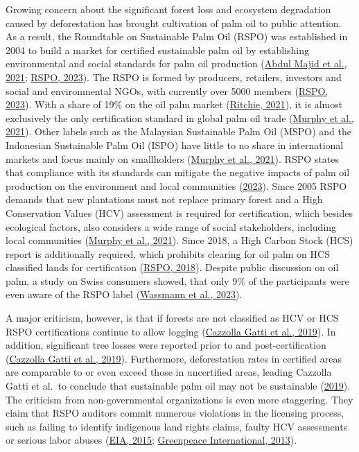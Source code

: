 \documentclass[
  letterpaper,
  DIV=11,
  numbers=noendperiod]{scrreprt}
\begin{document}
Growing concern about the significant forest loss and ecosystem
degradation caused by deforestation has brought cultivation of palm oil
to public attention. As a result, the Roundtable on Sustainable Palm Oil
(RSPO) was established in 2004 to build a market for certified
sustainable palm oil by establishing environmental and social standards
for palm oil production
(\protect\hyperlink{ref-abdulmajidSustainablePalmOil2021}{Abdul Majid et
al., 2021}; \protect\hyperlink{ref-rspoWhoWeAre2023}{RSPO, 2023}). The
RSPO is formed by producers, retailers, investors and social and
environmental NGOs, with currently over 5000 members
(\protect\hyperlink{ref-rspoWhoWeAre2023}{RSPO, 2023}). With a share of
19\% on the oil palm market
(\protect\hyperlink{ref-ritchiePalmOil2021}{Ritchie, 2021}), it is
almost exclusively the only certification standard in global palm oil
trade (\protect\hyperlink{ref-murphyOilPalm2020s2021}{Murphy et al.,
2021}). Other labels such as the Malaysian Sustainable Palm Oil (MSPO)
and the Indonesian Sustainable Palm Oil (ISPO) have little to no share
in international markets and focus mainly on smallholders
(\protect\hyperlink{ref-murphyOilPalm2020s2021}{Murphy et al., 2021}).
RSPO states that compliance with its standards can mitigate the negative
impacts of palm oil production on the environment and local communities
(\protect\hyperlink{ref-rspoWhoWeAre2023}{2023}). Since 2005 RSPO
demands that new plantations must not replace primary forest and a High
Conservation Values (HCV) assessment is required for certification,
which besides ecological factors, also considers a wide range of social
stakeholders, including local communities
(\protect\hyperlink{ref-murphyOilPalm2020s2021}{Murphy et al., 2021}).
Since 2018, a High Carbon Stock (HCS) report is additionally required,
which prohibits clearing for oil palm on HCS classified lands for
certification
(\protect\hyperlink{ref-rspoRSPOPrinciplesCriteria2018}{RSPO, 2018}).
Despite public discussion on oil palm, a study on Swiss consumers
showed, that only 9\% of the participants were even aware of the RSPO
label (\protect\hyperlink{ref-wassmannPalmOilRoundtable2023}{Wassmann et
al., 2023}).

A major criticism, however, is that if forests are not classified as HCV
or HCS RSPO certifications continue to allow logging
(\protect\hyperlink{ref-cazzollagattiSustainablePalmOil2019}{Cazzolla
Gatti et al., 2019}). In addition, significant tree losses were reported
prior to and post-certification
(\protect\hyperlink{ref-cazzollagattiSustainablePalmOil2019}{Cazzolla
Gatti et al., 2019}). Furthermore, deforestation rates in certified
areas are comparable to or even exceed those in uncertified areas,
leading Cazzolla Gatti et al.~to conclude that sustainable palm oil may
not be sustainable
(\protect\hyperlink{ref-cazzollagattiSustainablePalmOil2019}{2019}). The
criticism from non-governmental organizations is even more staggering.
They claim that RSPO auditors commit numerous violations in the
licensing process, such as failing to identify indigenous land rights
claims, faulty HCV assessments or serious labor abuses
(\protect\hyperlink{ref-eiaWhoWatchesWatchmen2015}{EIA, 2015};
\protect\hyperlink{ref-greenpeaceinternationalCertifyingDestruction2013}{Greenpeace
International, 2013}).
\end{document}
